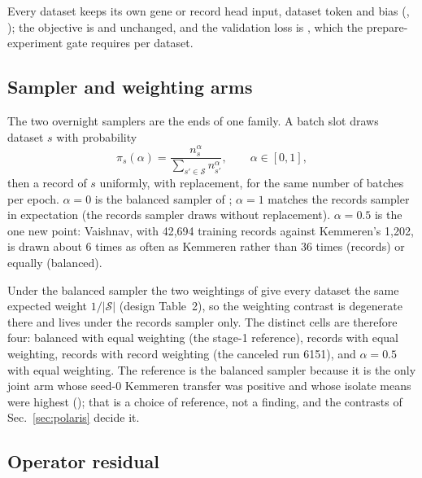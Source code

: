 Every dataset keeps its own gene or record head input, dataset token and bias
(, ); the objective is  and  unchanged, and the
validation loss is , which the prepare-experiment gate requires per dataset.

\subsection{Sampler and weighting arms}
\label{sec:sampler}

The two overnight samplers are the ends of one family. A batch slot draws dataset $s$ with
probability
\begin{equation}
\pi_s(\alpha) = \frac{n_s^{\alpha}}{\sum_{s' \in \mathcal{S}} n_{s'}^{\alpha}},
\qquad \alpha \in [0, 1],
\label{eq:sampler}
\end{equation}
then a record of $s$ uniformly, with replacement, for the same number of batches per epoch.
$\alpha = 0$ is the balanced sampler of ; $\alpha = 1$ matches the records
sampler in expectation (the records sampler draws without replacement). $\alpha = 0.5$ is
the one new point: Vaishnav, with 42{,}694 training records against Kemmeren's 1{,}202, is
drawn about 6 times as often as Kemmeren rather than 36 times (records) or equally
(balanced).

Under the balanced sampler the two weightings of  give every dataset the same
expected weight $1/|\mathcal{S}|$ (design Table~2), so the weighting contrast is degenerate
there and lives under the records sampler only. The distinct cells are therefore four:
balanced with equal weighting (the stage-1 reference), records with equal weighting, records
with record weighting (the canceled run 6151), and $\alpha = 0.5$ with equal weighting. The
reference is the balanced sampler because it is the only joint arm whose seed-0 Kemmeren
transfer was positive and whose isolate means were highest (); that is a choice of
reference, not a finding, and the contrasts of Sec.~\ref{sec:polaris} decide it.

\subsection{Operator residual}
\label{sec:residual}

